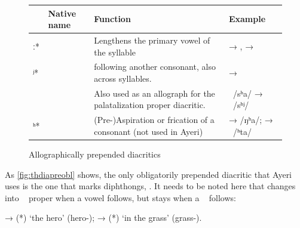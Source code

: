 
\begin{figure}[htp]
\caption{Allographically prepended diacritics}
\begin{tabu} to 
\toprule
\tableheaderfont

	& Native name
	& Function
	& Example
	\\
	
\toprule

ː*
	& 
	& Lengthens the primary vowel of the syllable
	&  → ,\newline
		 → 
	\\
	
\midrule

ʲ*
	& 
	&  following another consonant, also across syllables.
	&  → 
	\\
	
	
	& 
	& Also used as an allograph for the palatalization proper diacritic.
	& ~/sʰa/ → ~/sʰʲ/
	\\
	
\midrule

ʰ*
	& 
	& (Pre-)Aspiration or frication of a consonant (not used in Ayeri)
	&  →  /ŋʰa/;\newline
		 → ~/ʰta/
	\\

\bottomrule
\end{tabu}
\label{fig:thdiapreallo}
\end{figure}

As \autoref{fig:thdiapreobl} shows, the only obligatorily prepended diacritic 
that Ayeri uses is the one that marks diphthongs, . 
It needs to be noted here that  changes into ~ proper 
when a vowel follows, but stays  when a ~ follows:

\pex
	\a {} → 
		 (*) 
		`the hero' (hero-\Aarg{});
	\a {} → 
		 (*)  `in 
		the grass' (grass-\Loc{}).
\xe

